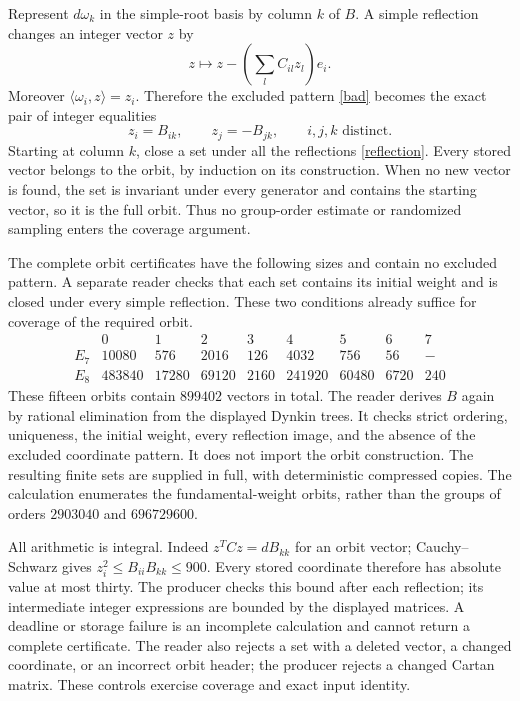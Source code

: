 \documentclass[11pt,a4paper]{article}
\begin{document}
Represent $d\omega_k$ in the simple-root basis by column $k$ of $B$.
A simple reflection changes an integer vector $z$ by
\begin{equation}\label{reflection}
 z\longmapsto z-\left(\sum_l C_{il}z_l\right)e_i.
\end{equation}
Moreover $\langle\omega_i,z\rangle=z_i$. Therefore the excluded pattern
\eqref{bad} becomes the exact pair of integer equalities
\[
 z_i=B_{ik},\qquad z_j=-B_{jk},\qquad i,j,k\text{ distinct}.
\]
Starting at column $k$, close a set under all the reflections
\eqref{reflection}. Every stored vector belongs to the orbit, by induction
on its construction. When no new vector is found, the set is invariant
under every generator and contains the starting vector, so it is the full
orbit. Thus no group-order estimate or randomized sampling enters the
coverage argument.

The complete orbit certificates have the following sizes and contain no
excluded pattern. A separate reader checks that each set contains its
initial weight and is closed under every simple reflection. These two
conditions already suffice for coverage of the required orbit.
\[
\begin{array}{c|rrrrrrrr}
 &0&1&2&3&4&5&6&7\\\hline
 E_7&10080&576&2016&126&4032&756&56&-\\
 E_8&483840&17280&69120&2160&241920&60480&6720&240
\end{array}
\]
These fifteen orbits contain $899402$ vectors in total. The reader derives
$B$ again by rational elimination from the displayed Dynkin trees. It checks
strict ordering, uniqueness, the initial weight, every reflection image,
and the absence of the excluded coordinate pattern. It does not import
the orbit construction. The resulting finite sets are supplied in full,
with deterministic compressed copies. The calculation enumerates the
fundamental-weight orbits, rather than the groups of orders $2903040$
and $696729600$.

All arithmetic is integral. Indeed $z^TCz=dB_{kk}$ for an orbit vector;
Cauchy--Schwarz gives $z_i^2\leq B_{ii}B_{kk}\leq900$.
Every stored coordinate therefore has absolute value at most thirty.
The producer checks this bound after each reflection; its intermediate
integer expressions are bounded by the displayed matrices. A deadline or
storage failure is an incomplete calculation and cannot return a complete
certificate. The reader also rejects a set with a deleted vector, a changed
coordinate, or an incorrect orbit header; the producer rejects a changed
Cartan matrix. These controls exercise coverage and exact input identity.
\end{document}
